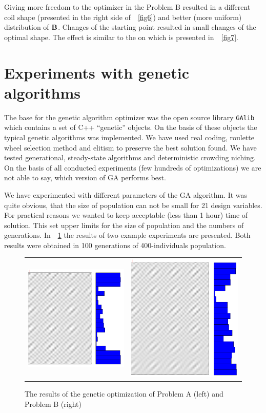 \documentclass[twocolumn,a4paper]{article}
\def\vect#1{\text{\bf #1}}
\def\rref#1{\figurename~\ref{#1}}
\begin{document}
Giving more freedom to the optimizer in the Problem B resulted in a different coil shape (presented in the right side of~\rref{fig6}) and better (more uniform) distribution of $\vect{B}$. Changes of the starting point resulted in small changes of the optimal shape. The effect is similar to the on which is presented in~\rref{fig7}.


\section{Experiments with genetic algorithms}
The base for the genetic algorithm optimizer was the open source library \texttt{GAlib}~\cite{GAlib} which contains a set of C++ ``genetic'' objects. On the basis of these objects the typical genetic algorithms was implemented.
We have used real coding, roulette wheel selection method and elitism to preserve the best solution found. We have tested generational, steady-state algorithms and deterministic crowding niching. On the basis of all conducted experiments (few hundreds of optimizations) we are not able to say, which version of GA performs best.

We have experimented with different parameters of the GA algorithm. It was quite obvious, that the size of population can not be small for 21 design variables. For practical reasons we wanted to keep acceptable (less than 1 hour) time of solution. This set upper limits for the size of population and the numbers of generations. In~\rref{fig8} the results of two example experiments are presented. Both results were obtained in 100 generations of 400-individuals population.
\begin{figure}[htb]
\begin{center}
\begin{tabular}{m{}m{}}
 \centering\includegraphics[height=0.35\columnwidth]{img/GAOpt_coil_0p03.png} &
 \centering\includegraphics[height=0.35\columnwidth]{img/GAOpt_coil_0p05.png}
\end{tabular}
 \caption{The results of the genetic optimization of Problem A (left) and Problem B (right)}
 \label{fig8}
 \end{center}
\end{figure}
\end{document}
